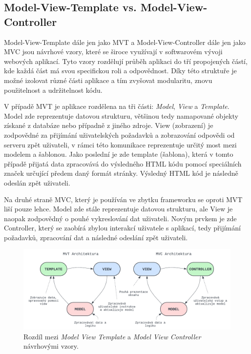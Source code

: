 \subsection*{Model-View-Template vs. Model-View-Controller}
Model-View-Template dále jen jako MVT a Model-View-Controller dále jen jako MVC jsou návrhové vzory, které se široce využívají v softwarovém vývoji webových aplikací. Tyto vzory rozdělují průběh aplikaci do tří propojených částí, kde každá část má svou specifickou roli a odpovědnost. Díky této struktuře je možné izolovat různé části aplikace a tím zvyšovat modularitu, znovu použitelnost a udržitelnost kódu.

V případě MVT je aplikace rozdělena na tři části: \textit{Model}, \textit{View} a \textit{Template}. Model zde reprezentuje datovou strukturu, většinou tedy namapované objekty získané z databáze nebo případně z jiného zdroje. View (zobrazení) je zodpovědné za přijímání uživatelských požadavků a zobrazování odpovědi od serveru zpět uživateli, v rámci této komunikace reprezentuje určitý most mezi modelem a šablonou. Jako poslední je zde template (šablona), která v tomto případě přijatá data zpracovává do výsledného HTML kódu pomocí speciálních značek určující předem daný formát stránky. Výsledný HTML kód je následně odeslán zpět uživateli.

Na druhé straně MVC, který je používán ve zbytku frameworku se oproti MVT liší pouze lehce. Model zde stále reprezentuje datovou strukturu, ale View je naopak zodpovědný o pouhé vykreslování dat uživateli. Novým prvkem je zde Controller, který se zaobírá zbylou interakcí uživatele s aplikací, tedy přijímání požadavků, zpracování dat a následné odeslání zpět uživateli. \cite{mvc_mvt_difference}

\begin{figure}[H]
    \centering
    \includegraphics[width=1.0\textwidth]{diagrams/MVC_MVT_Architecture}
    \caption{Rozdíl mezi \textit{Model View Template} a \textit{Model View Controller} návrhovými vzory. \cite{mvc_mvt_difference_img}}
    \label{fig:mvc_mvt_difference}
\end{figure}

